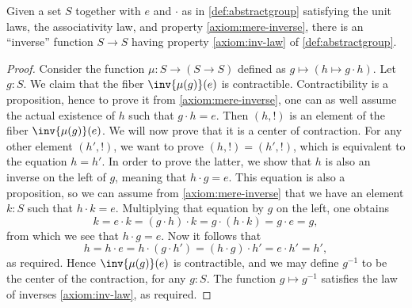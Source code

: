 \begin{lemma}%
  \label{lem:group-inv-operation}%
  Given a set $S$ together with $e$ and $\cdot$ as in
  \cref{def:abstractgroup} satisfying the unit laws, the associativity
  law, and property \ref{axiom:mere-inverse}, there is an ``inverse'' function
  $S \to S$ having property \ref{axiom:inv-law} of \cref{def:abstractgroup}.
\end{lemma}

\begin{proof}
  Consider the function $\mu: S \to (S \to S)$ defined as
  $g\mapsto (h \mapsto g\cdot h)$. Let $g:S$. We claim that the fiber
  $\inv{\mu(g)}(e)$ is contractible.  Contractibility is a proposition, hence to
  prove it from \ref{axiom:mere-inverse}, one can as well assume the
  actual existence of $h$ such that $g\cdot h = e$. Then $(h,!)$ is an
  element of the fiber $\inv{\mu(g)}(e)$. We will now prove that it is
  a center of contraction. For any other element $(h',!)$, we want to
  prove $(h,!) = (h',!)$, which is equivalent to the equation $h=h'$. In
  order to prove the latter, we show that $h$ is also an inverse on
  the left of $g$, meaning that $h\cdot g=e$.  This equation is also a
  proposition, so we can assume from \ref{axiom:mere-inverse} that we have an
  element $k:S$ such that $h\cdot k = e$.  Multiplying that equation by
  $g$ on the left, one obtains
  \begin{displaymath}
    k = e \cdot k = (g\cdot h)\cdot k = g\cdot (h\cdot k) = g\cdot e = g,
  \end{displaymath}
  from which we see that $h\cdot g=e$.
  Now it follows that
  \begin{displaymath}
    h = h \cdot e = h \cdot (g\cdot h') = (h \cdot g) \cdot h' = e \cdot h' = h',
  \end{displaymath}
  as required. Hence $\inv{\mu(g)}(e)$ is contractible, and we may define $g^{-1}$ to
  be the center of the contraction, for any $g:S$.
  The function $g \mapsto g^{-1}$ satisfies the law of inverses \ref{axiom:inv-law}, as required.
\end{proof}



